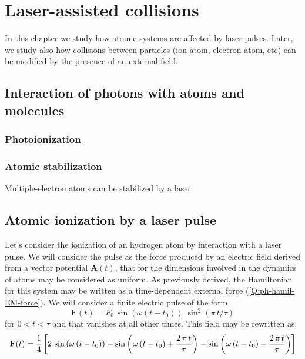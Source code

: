 \chapter{Laser-assisted collisions}

In this chapter we study how atomic systems are affected by laser pulses. Later, we study also how collisions between particles (ion-atom, electron-atom, etc) can be modified by the presence of an external field.

\section{Interaction of photons with atoms and molecules}

\subsection{Photoionization}
\label{S:photoionization}


\subsection{Atomic stabilization}
\label{S:atomic-stabilization}

Multiple-electron atoms can be stabilized by a laser \cite{Gavrila2002JPBpR147}


\section{Atomic ionization by a laser pulse}
\label{S:atomic-ionization}
Let's consider the ionization of an hydrogen atom by interaction with a laser pulse. We will consider the pulse as the force produced by an electric field derived from a vector potential $\bm{A}(t)$, that for the dimensions involved in the dynamics of atoms may be considered as uniform. As previously derived, the Hamiltonian for this system may be written as a time-dependent external force (\ref{Q:ph-hamil-EM-force}). We will consider a finite electric pulse of the form
\begin{equation} \label{Q:electric-field-Ft-0}
\bm{F}(t)= F_{0}\, \sin{(\omega (t-t_{0}))}\; \sin^{2}{(\pi\,t/\tau)} 
\end{equation}
for $0 < t < \tau $ and that vanishes at all other times. This field may be rewritten as:
\begin{equation} \label{Q:electric-field-Ft}
\mathbf{F}(t)= \frac{1}{4}\left[2\, \sin \left(\omega\, (t-t_{0})\right) - {\sin \left(\omega \, (t-t_{0}) +{{2\,\pi\,t}\over{\tau}}\right) - \sin \left(\omega\, (t-t_{0}) - \frac{2\,\pi\,t}{\tau} \right)} 
 \right]
\end{equation}

